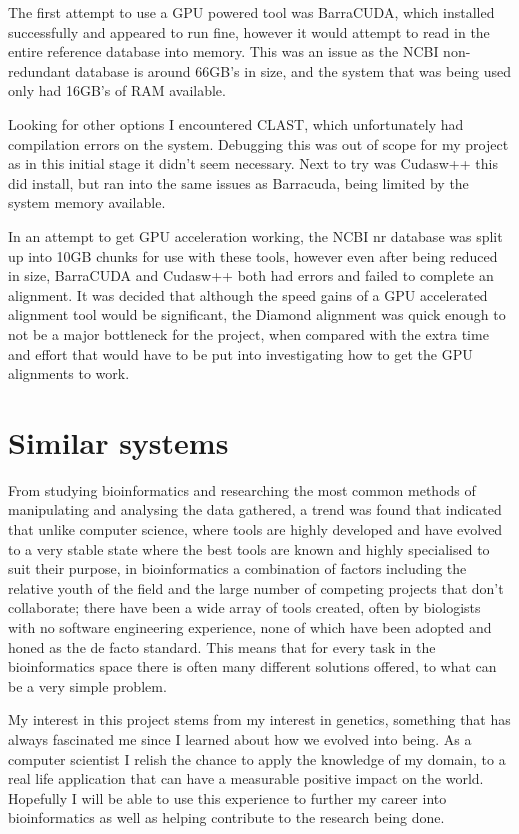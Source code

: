 The first attempt to use a GPU powered tool was BarraCUDA\cite{barracuda}, which installed successfully and appeared to run fine, however it would attempt to read in the entire reference database into memory. This was an issue as the NCBI non-redundant database is around 66GB's in size, and the system that was being used only had 16GB's of RAM available. 

Looking for other options I encountered CLAST\cite{clast}, which unfortunately had compilation errors on the system. Debugging this was out of scope for my project as in this initial stage it didn't seem necessary. Next to try was Cudasw++\cite{cudasw} this did install, but ran into the same issues as Barracuda, being limited by the system memory available. 

In an attempt to get GPU acceleration working, the NCBI nr database was split up into 10GB chunks for use with these tools, however even after being reduced in size, BarraCUDA and Cudasw++ both had errors and failed to complete an alignment. It was decided that although the speed gains of a GPU accelerated alignment tool would be significant, the Diamond alignment was quick enough to not be a major bottleneck for the project, when compared with the extra time and effort that would have to be put into investigating how to get the GPU alignments to work. 

\section{Similar systems}

From studying bioinformatics and researching the most common methods of manipulating and analysing the data gathered, a trend was found that indicated that unlike computer science, where tools are highly developed and have evolved to a very stable state where the best tools are known and highly specialised to suit their purpose, in bioinformatics a combination of factors including the relative youth of the field and the large number of competing projects that don't collaborate; there have been a wide array of tools created, often by biologists with no software engineering experience, none of which have been adopted and honed as the de facto standard. This means that for every task in the bioinformatics space there is often many different solutions offered, to what can be a very simple problem. 


My interest in this project stems from my interest in genetics, something that has always fascinated me since I learned about how we evolved into being. As a computer scientist I relish the chance to apply the knowledge of my domain, to a real life application that can have a measurable positive impact on the world. Hopefully I will be able to use this experience to further my career into bioinformatics as well as helping contribute to the research being done. 

